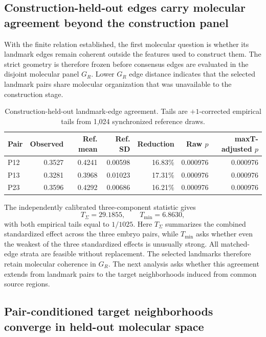 \documentclass[11pt]{article}
\begin{document}
\subsection{Construction-held-out edges carry molecular agreement beyond the construction panel}

With the finite relation established, the first molecular question is whether its landmark edges remain coherent outside the features used to construct them. The strict geometry is therefore frozen before consensus edges are evaluated in the disjoint molecular panel \(G_R\). Lower \(G_R\) edge distance indicates that the selected landmark pairs share molecular organization that was unavailable to the construction stage.

\begin{table}[H]
\centering
\small
\caption{Construction-held-out landmark-edge agreement. Tails are \(+1\)-corrected empirical tails from 1,024 synchronized reference draws.}
\label{tab:edge_primary}
\begin{tabular}{@{}lrrrrrr@{}}
\toprule
Pair & Observed & Ref. mean & Ref. SD & Reduction & Raw \(p\) & maxT-adjusted \(p\)\\
\midrule
P12&0.3527&0.4241&0.00598&16.83\%&0.000976&0.000976\\
P13&0.3281&0.3968&0.01023&17.31\%&0.000976&0.000976\\
P23&0.3596&0.4292&0.00686&16.21\%&0.000976&0.000976\\
\bottomrule
\end{tabular}
\end{table}

The independently calibrated three-component statistic gives
\[
T_\Sigma=29.1855,\qquad T_{\min}=6.8630,
\]
with both empirical tails equal to \(1/1025\). Here \(T_\Sigma\) summarizes the combined standardized effect across the three embryo pairs, while \(T_{\min}\) asks whether even the weakest of the three standardized effects is unusually strong. All matched-edge strata are feasible without replacement. The selected landmarks therefore retain molecular coherence in \(G_R\). The next analysis asks whether this agreement extends from landmark pairs to the target neighborhoods induced from common source regions.

\subsection{Pair-conditioned target neighborhoods converge in held-out molecular space}
\end{document}
